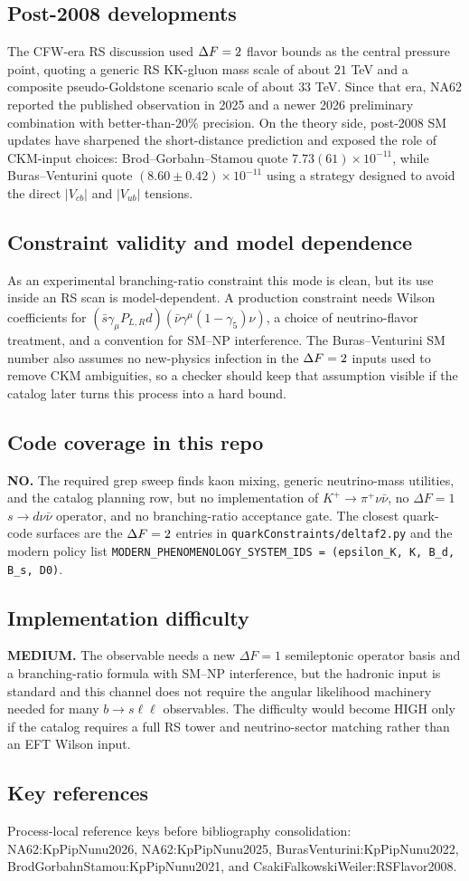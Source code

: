 \subsection*{Post-2008 developments}
The CFW-era RS discussion used \(\Delta F=2\) flavor bounds as the central
pressure point, quoting a generic RS KK-gluon mass scale of about \(21\) TeV
and a composite pseudo-Goldstone scenario scale of about \(33\) TeV.  Since
that era, NA62 reported the published observation in 2025 and a newer 2026
preliminary combination with better-than-\(20\%\) precision.  On the theory
side, post-2008 SM updates have sharpened the short-distance prediction and
exposed the role of
CKM-input choices: Brod--Gorbahn--Stamou quote \(7.73(61)\times10^{-11}\),
while Buras--Venturini quote \((8.60\pm0.42)\times10^{-11}\) using a strategy
designed to avoid the direct \(|V_{cb}|\) and \(|V_{ub}|\) tensions.

\subsection*{Constraint validity and model dependence}
As an experimental branching-ratio constraint this mode is clean, but its use
inside an RS scan is model-dependent.  A production constraint needs Wilson
coefficients for
\((\bar{s}\gamma_\mu P_{L,R}d)(\bar{\nu}\gamma^\mu(1-\gamma_5)\nu)\), a
choice of neutrino-flavor treatment, and a convention for SM--NP interference.
The Buras--Venturini SM number also assumes no new-physics infection in the
\(\Delta F=2\) inputs used to remove CKM ambiguities, so a checker should keep
that assumption visible if the catalog later turns this process into a hard
bound.

\subsection*{Code coverage in this repo}
\textbf{NO.}  The required grep sweep finds kaon mixing, generic
neutrino-mass utilities, and the catalog planning row, but no implementation
of \(K^+\to\pi^+\nu\bar{\nu}\), no \(\Delta F=1\) \(s\to d\nu\bar{\nu}\)
operator, and no branching-ratio acceptance gate.  The closest quark-code
surfaces are the \(\Delta F=2\) entries in
\texttt{quarkConstraints/deltaf2.py} and the modern policy list
\texttt{MODERN\_PHENOMENOLOGY\_SYSTEM\_IDS = (epsilon\_K, K, B\_d, B\_s, D0)}.

\subsection*{Implementation difficulty}
\textbf{MEDIUM.}  The observable needs a new \(\Delta F=1\)
semileptonic operator basis and a branching-ratio formula with SM--NP
interference, but the hadronic input is standard and this channel does not
require the angular likelihood machinery needed for many \(b\to s\ell\ell\)
observables.  The difficulty would become HIGH only if the catalog requires a
full RS tower and neutrino-sector matching rather than an EFT Wilson input.

\subsection*{Key references}
Process-local reference keys before bibliography consolidation:
NA62:KpPipNunu2026, NA62:KpPipNunu2025,
BurasVenturini:KpPipNunu2022, BrodGorbahnStamou:KpPipNunu2021, and
CsakiFalkowskiWeiler:RSFlavor2008.
